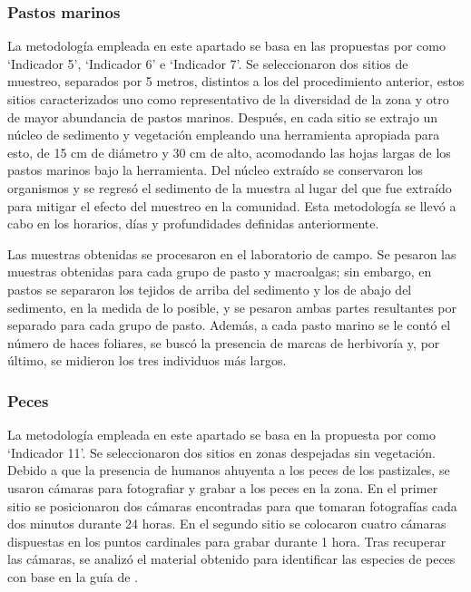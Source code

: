 \documentclass[
  authoryear,
  preprint,
  3p,
  twocolumn]{elsarticle}
\begin{document}
\subsubsection{Pastos marinos}\label{pastos-marinos}

La metodología empleada en este apartado se basa en las propuestas por
\citet{Botello2022} como `Indicador 5', `Indicador 6' e `Indicador 7'.
Se seleccionaron dos sitios de muestreo, separados por 5 metros,
distintos a los del procedimiento anterior, estos sitios caracterizados
uno como representativo de la diversidad de la zona y otro de mayor
abundancia de pastos marinos. Después, en cada sitio se extrajo un
núcleo de sedimento y vegetación empleando una herramienta apropiada
para esto, de 15 cm de diámetro y 30 cm de alto, acomodando las hojas
largas de los pastos marinos bajo la herramienta. Del núcleo extraído se
conservaron los organismos y se regresó el sedimento de la muestra al
lugar del que fue extraído para mitigar el efecto del muestreo en la
comunidad. Esta metodología se llevó a cabo en los horarios, días y
profundidades definidas anteriormente.

Las muestras obtenidas se procesaron en el laboratorio de campo. Se
pesaron las muestras obtenidas para cada grupo de pasto y macroalgas;
sin embargo, en pastos se separaron los tejidos de arriba del sedimento
y los de abajo del sedimento, en la medida de lo posible, y se pesaron
ambas partes resultantes por separado para cada grupo de pasto. Además,
a cada pasto marino se le contó el número de haces foliares, se buscó la
presencia de marcas de herbivoría y, por último, se midieron los tres
individuos más largos.

\subsubsection{Peces}\label{peces}

La metodología empleada en este apartado se basa en la propuesta por
\citet{Botello2022} como `Indicador 11'. Se seleccionaron dos sitios en
zonas despejadas sin vegetación. Debido a que la presencia de humanos
ahuyenta a los peces de los pastizales, se usaron cámaras para
fotografiar y grabar a los peces en la zona. En el primer sitio se
posicionaron dos cámaras encontradas para que tomaran fotografías cada
dos minutos durante 24 horas. En el segundo sitio se colocaron cuatro
cámaras dispuestas en los puntos cardinales para grabar durante 1 hora.
Tras recuperar las cámaras, se analizó el material obtenido para
identificar las especies de peces con base en la guía de
\citet{Gallardo-Torres2014}.
\end{document}
